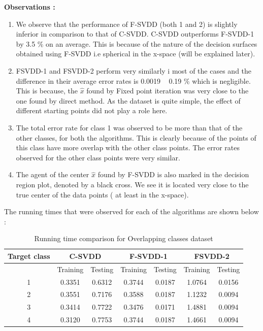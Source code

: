 \documentclass{article} %
\begin{document}
\textbf{Observations :}
\begin{enumerate}
\item We observe that the performance of F-SVDD  (both 1 and 2) is slightly inferior in comparison to that of C-SVDD. C-SVDD outperforms F-SVDD-1 by 3.5 \% on an average. This is because of the nature of the decision surfaces obtained using F-SVDD i.e  spherical in the x-space (will be explained later).

\item FSVDD-1 and FSVDD-2 perform very similarly i most of the cases and the difference in their average error rates is 0.0019 ~ 0.19 \% which is negligible. This is because, the $\hat{x}$ found by Fixed point iteration was very close to the one found by direct method. As the dataset is quite simple, the effect of different starting points did not play a role here.

\item The total error rate for class 1 was observed to be more than that of the other classes, for both the algorithms. This is clearly because of the points of this class have more overlap with the other class points. The error rates observed for the other class points were very similar.
\item The agent of the center $\hat{x}$ found by F-SVDD is also marked in the decision region plot, denoted by a black cross. We see it is located very close to the true center of the data points ( at least in the x-space).

\end{enumerate}


The running times that were observed for each of the algorithms are shown below :
\begin{table}[t]
\begin{center}
\caption{Running time comparison for Overlapping classes dataset}
\begin{tabular}{|c|c|c|c|c|c|c|}
\hline
Target class & \multicolumn{2}{|c|}{C-SVDD} & \multicolumn{2}{|c|}{F-SVDD-1} & \multicolumn{2}{|c|}{FSVDD-2}  \\ \hline
& Training & Testing & Training & Testing & Training & Testing \\ \hline
1 & 0.3351 & 0.6312 & 0.3744  & 0.0187 & 1.0764 & 0.0156 \\ \hline
2 & 0.3551 & 0.7176 & 0.3588 & 0.0187 & 1.1232 & 0.0094 \\ \hline
3 & 0.3414 & 0.7722 & 0.3476 & 0.0171 & 1.4881 & 0.0094 \\ \hline
4 & 0.3120 & 0.7753 & 0.3744 & 0.0187 & 1.4661 &  0.0094 \\ \hline

\end{tabular} \\[5pt]
\end{center}
\end{table}
\end{document}
